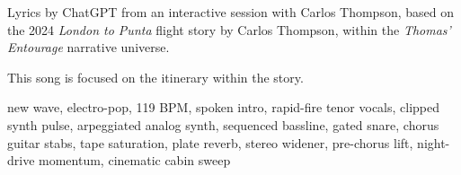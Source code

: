 
\begin{notes}
Lyrics by ChatGPT from an interactive session with Carlos Thompson, %
based on the 2024 \emph{London to Punta} flight story by Carlos Thompson, within the \emph{Thomas’ Entourage} narrative universe.

This song is focused on the itinerary within the story.
\end{notes}
\begin{style}
new wave, electro-pop, 119 BPM, spoken intro, rapid-fire tenor vocals, clipped synth pulse, arpeggiated analog synth, sequenced bassline, gated snare, chorus guitar stabs, tape saturation, plate reverb, stereo widener, pre-chorus lift, night-drive momentum, cinematic cabin sweep
\end{style}
